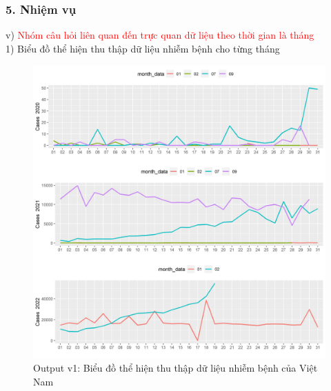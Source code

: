 \documentclass[english,10pt,table]{beamer}
\begin{document}
\begin{frame}[fragile]
\frametitle{5.  Nhiệm vụ}
v) \textcolor{red}{Nhóm câu hỏi liên quan đến trực quan dữ liệu theo thời gian là tháng}\\
    1) Biểu đồ thể hiện thu thập dữ liệu nhiễm bệnh cho từng tháng
	\begin{figure}[h!]
	\begin{center}
		    \includegraphics[scale = 0.28]{Images/V/v1 Vietnam .jpeg}
		     \caption{Output v1: Biểu đồ thể hiện thu thập dữ liệu nhiễm bệnh của Việt Nam}
		\end{center}
		\end{figure}
\end{frame}
\end{document}
